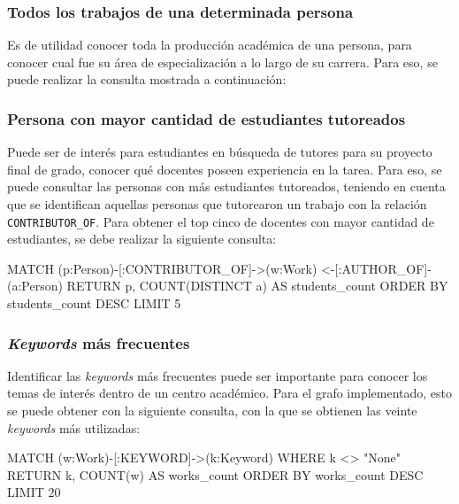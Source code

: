 \documentclass[journal]{IEEEtran}
\begin{document}
\subsubsection{Todos los trabajos de una determinada persona}
Es de utilidad conocer toda la producción académica de una persona, para conocer cual fue su área de especialización a lo largo de su carrera. Para eso, se puede realizar la consulta mostrada a continuación:


\subsubsection{Persona con mayor cantidad de estudiantes tutoreados}
Puede ser de interés para estudiantes en búsqueda de tutores para su proyecto final de grado, conocer qué docentes poseen experiencia en la tarea. Para eso, se puede consultar las personas con más estudiantes tutoreados, teniendo en cuenta que se identifican aquellas personas que tutorearon un trabajo con la relación \texttt{CONTRIBUTOR\_OF}. Para obtener el top cinco de docentes con mayor cantidad de estudiantes, se debe realizar la siguiente consulta:

\begin{sflisting}[style=sparql,caption= Docentes con mayor cantidad de estudiantes tutoreados,label=codigo2]
	MATCH (p:Person)-[:CONTRIBUTOR_OF]->(w:Work)
	<-[:AUTHOR_OF]-(a:Person)
	RETURN p, COUNT(DISTINCT a) AS students_count
	ORDER BY students_count DESC
	LIMIT 5
\end{sflisting}

\subsubsection{\textit{Keywords} más frecuentes}
Identificar las \textit{keywords} más frecuentes puede ser importante para conocer los temas de interés dentro de un centro académico. Para el grafo implementado, esto se puede obtener con la siguiente consulta, con la que se obtienen las veinte \textit{keywords} más utilizadas:

\begin{sflisting}[style=sparql,caption= \textit{Keywords} más frecuentes,label=codigo2]
	MATCH (w:Work)-[:KEYWORD]->(k:Keyword)
	WHERE k <> "None"
	RETURN k, COUNT(w) AS works_count
	ORDER BY works_count DESC
	LIMIT 20
\end{sflisting}
\end{document}
